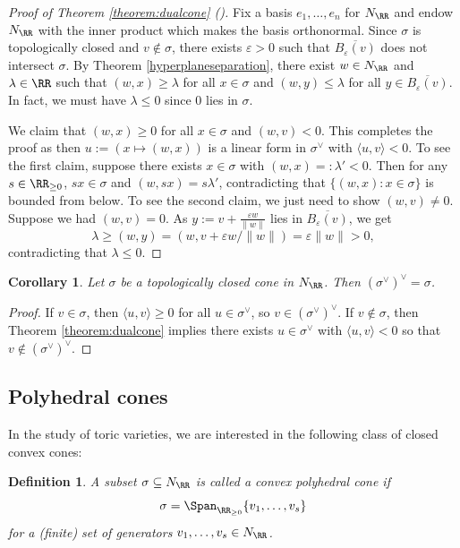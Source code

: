 \documentclass[12pt]{amsart}
\theoremstyle{plain}
\newtheorem{definition}[theorem]{Definition}
\newtheorem{corollary}[theorem]{Corollary}
\begin{document}
\begin{proof}[Proof of Theorem \ref{theorem:dualcone} \textup{(\cite[Example 2.20]{BV04})}]
Fix a basis $e_1, \ldots, e_n$ for $N_\RR$ and endow $N_\RR$ with the inner product which makes the basis orthonormal.
Since $\sigma$ is topologically closed and $v \notin \sigma$, there exists $\varepsilon > 0$ such that $\overline{B_\varepsilon(v)}$ does not intersect $\sigma$.
By Theorem \ref{hyperplaneseparation}, there exist $w \in N_\RR$ and $\lambda \in \RR$ such that $(w, x) \ge \lambda$ for all $x \in \sigma$ and $(w, y) \le \lambda$ for all $y \in \overline{B_\varepsilon(v)}$.
In fact, we must have $\lambda \le 0$ since $0$ lies in $\sigma$.

We claim that $(w, x) \ge 0$ for all $x \in \sigma$ and $(w, v) < 0$.
This completes the proof as then $u := (x \mapsto (w, x))$ is a linear form in $\sigma^\vee$ with $\langle u, v \rangle < 0$.
To see the first claim, suppose there exists $x \in \sigma$ with $(w, x) =: \lambda' < 0$.
Then for any $s \in \RR_{\ge 0}$, $s x \in \sigma $ and $(w, s x) = s \lambda'$, contradicting that $\{(w, x) : x \in \sigma\}$ is bounded from below.
To see the second claim, we just need to show $(w, v) \ne 0$.
Suppose we had $(w, v) = 0$.
As $y := v + \frac{\varepsilon w}{\|w\|}$ lies in $\overline{B_\varepsilon(v)}$, we get
$$\lambda \ge (w, y) = (w, v + \varepsilon w/\|w\|) = \varepsilon \|w\| > 0,$$
contradicting that $\lambda \le 0$.
\end{proof}

\begin{corollary}\label{corollary:doubledual}
Let $\sigma$ be a topologically closed cone in $N_\RR$.
Then $(\sigma^\vee)^\vee = \sigma$.
\end{corollary}
\begin{proof}
If $v \in \sigma$, then $\langle u, v\rangle \ge 0$ for all $u \in \sigma^\vee$, so $v \in (\sigma^\vee)^\vee$.
If $v \notin \sigma$, then Theorem \ref{theorem:dualcone} implies there exists $u \in \sigma^\vee$ with $\langle u, v \rangle < 0$ so that $v \notin (\sigma^\vee)^\vee$.
\end{proof}

\subsection{Polyhedral cones}\label{polyhedralcones}
In the study of toric varieties, we are interested in the following class of closed convex cones:

\begin{definition}\label{convexpolyhedraldef}
A subset $\sigma \subseteq N_\RR$ is called a convex polyhedral cone if
$$\sigma = \Span_{\RR_{\ge 0}} \{v_1, \ldots, v_s\}$$
for a (finite) set of generators $v_1, \ldots, v_s \in N_\RR$.
\end{definition}
\end{document}
